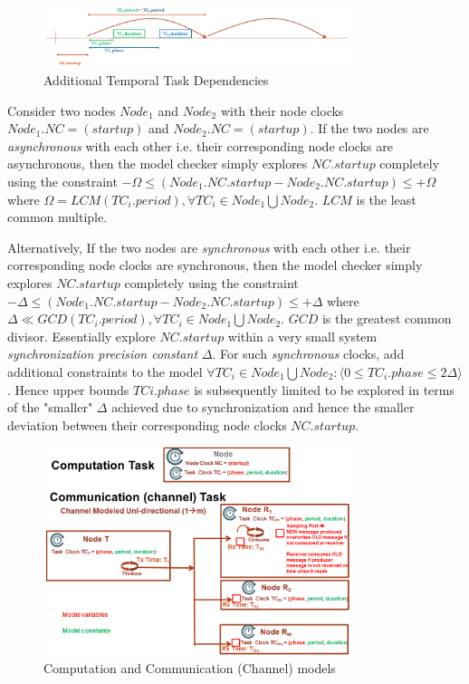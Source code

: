 \begin{figure}
\begin{center}
\includegraphics[width=0.8\textwidth]{figures/task_clock_dependencies}
\caption{Additional Temporal Task Dependencies}
\label{fig:task_clock_dependencies}
\end{center}
\end{figure}

Consider two nodes $Node_1$ and $Node_2$ with their node clocks $Node_1.NC=(startup)$ and  $Node_2.NC=(startup)$. If the two nodes are \emph{asynchronous} with each other i.e. their corresponding node clocks are asynchronous, then the model checker simply explores $NC.startup$ completely  using the constraint $-\Omega \leq (Node_1.NC.startup - Node_2.NC.startup) \leq +\Omega$ where $\Omega = LCM(TC_i.period), \forall TC_i \in Node_1 \bigcup Node_2 $. $LCM$ is the least common multiple.

Alternatively, If the two nodes are \emph{synchronous} with each other i.e. their corresponding node clocks are synchronous, then the model checker simply explores $NC.startup$ completely  using the constraint $-\Delta \leq (Node_1.NC.startup - Node_2.NC.startup) \leq +\Delta$ where $\Delta \ll GCD(TC_i.period), \forall TC_i \in Node_1 \bigcup Node_2 $. $GCD$ is the greatest common divisor. Essentially explore $NC.startup$ within a very small system \emph{synchronization precision constant} $\Delta$. For such \emph{synchronous} clocks, add additional constraints to the model $\forall TC_i \in Node_1 \bigcup Node_2: \langle 0 \leq TC_i.phase \leq 2\Delta\rangle$. Hence upper bounds $TCi.phase$ is subsequently limited to be explored in terms of the "smaller" $\Delta$ achieved due to synchronization and hence the smaller deviation between their corresponding node clocks $NC.startup$. 

\begin{figure}
\begin{center}
\includegraphics[width=0.8\textwidth]{figures/compute_comm_model}
\caption{Computation and Communication (Channel) models}
\label{fig:compute_comm_model}
\end{center}
\end{figure}

